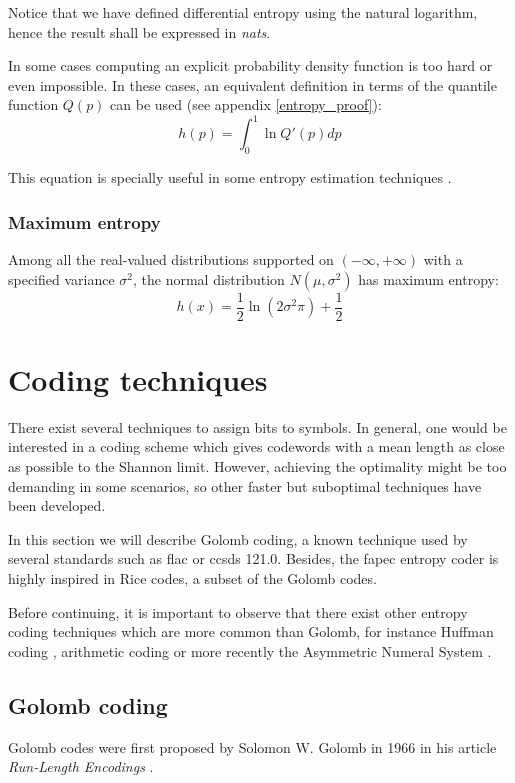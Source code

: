 Notice that we have defined differential entropy using the natural logarithm, hence the result shall be expressed in \textit{nats}.

In some cases computing an explicit probability density function is too hard or even impossible. In these cases, an equivalent definition in terms of the quantile function $Q(p)$ can be used (see appendix \ref{entropy_proof}):
\begin{equation} \label{eq:differential_entropy_q}
h(p) = \int_{0}^{1} \ln Q'(p) dp
\end{equation}

This equation is specially useful in some entropy estimation techniques \parencite{Vasicek}.

\subsubsection{Maximum entropy}
Among all the real-valued distributions supported on $(-\infty, +\infty)$ with a specified variance $\sigma^2$, the normal distribution $N(\mu, \sigma^2)$ has maximum entropy:
\begin{equation}
h(x) = \frac{1}{2} \ln (2\sigma^2\pi) + \frac{1}{2}
\end{equation}

\section{Coding techniques}
There exist several techniques to assign bits to symbols. In general, one would be interested in a coding scheme which gives codewords with a mean length as close as possible to the Shannon limit. However, achieving the optimality might be too demanding in some scenarios, so other faster but suboptimal techniques have been developed.

In this section we will describe Golomb coding, a known technique used by several standards such as \acrshort{flac} or \acrshort{ccsds} 121.0. Besides, the \acrshort{fapec} entropy coder is highly inspired in Rice codes, a subset of the Golomb codes.

Before continuing, it is important to observe that there exist other entropy coding techniques which are more common than Golomb, for instance Huffman coding \parencite{cover}, arithmetic coding \parencite{MacKay} or more recently the Asymmetric Numeral System \parencite{ans}.

\subsection{Golomb coding} \label{golomb-coding}

Golomb codes were first proposed by Solomon W. Golomb in 1966 in his article \textit{Run-Length Encodings} \parencite{Golomb1966}.

